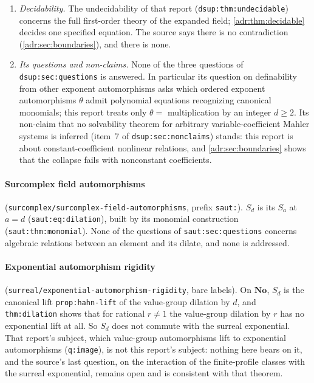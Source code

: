 \documentclass[11pt,letterpaper]{article}
\numberwithin{equation}{section}
\theoremstyle{definition}
\theoremstyle{remark}
\newcommand{\No}{\mathbf{No}}
\newcommand{\rpath}[1]{\nolinkurl{#1}}%
\newcommand{\lbl}[1]{\nolinkurl{#1}}%
\begin{document}
\begin{enumerate}[leftmargin=*,itemsep=3pt]
at the end of \cref{adr:sec:boundaries} stands.
\item \emph{Decidability.} The undecidability of that report
(\lbl{dsup:thm:undecidable}) concerns the full first-order theory of the
expanded field; \cref{adr:thm:decidable} decides one specified equation.
The source says there is no contradiction (\cref{adr:sec:boundaries}), and
there is none.
\item \emph{Its questions and non-claims.} None of the three questions of
\lbl{dsup:sec:questions} is answered. In particular its question on
definability from other exponent automorphisms asks which ordered exponent
automorphisms $\theta$ admit polynomial equations recognizing canonical
monomials; this report treats only $\theta=$ multiplication by an integer
$d\ge2$. Its non-claim that no solvability theorem for arbitrary
variable-coefficient Mahler systems is inferred (item~7 of
\lbl{dsup:sec:nonclaims}) stands: this report is about constant-coefficient
nonlinear relations, and \cref{adr:sec:boundaries} shows that the collapse
fails with nonconstant coefficients.
\end{enumerate}

\paragraph{Surcomplex field automorphisms}
(\rpath{surcomplex/surcomplex-field-automorphisms}, prefix \texttt{saut:}).
$S_d$ is its $S_a$ at $a=d$ (\lbl{saut:eq:dilation}), built by its
monomial construction (\lbl{saut:thm:monomial}). None of the questions of
\lbl{saut:sec:questions} concerns algebraic relations between an element
and its dilate, and none is addressed.

\paragraph{Exponential automorphism rigidity}
(\rpath{surreal/exponential-automorphism-rigidity}, bare labels). On $\No$,
$S_d$ is the canonical lift \lbl{prop:hahn-lift} of the value-group
dilation by $d$, and \lbl{thm:dilation} shows that for rational $r\ne1$ the
value-group dilation by $r$ has no exponential lift at all. So $S_d$ does not commute with the surreal
exponential. That report's subject, which value-group automorphisms lift to
exponential automorphisms (\lbl{q:image}), is not this report's subject:
nothing here bears on it, and the source's last question, on the
interaction of the finite-profile classes with the surreal exponential,
remains open and is consistent with that theorem.
\end{document}
